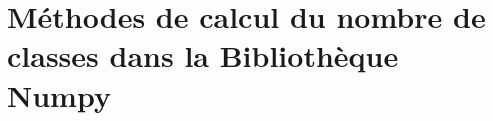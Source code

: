 \chapter{Méthodes de calcul du nombre de classes dans la Bibliothèque Numpy} \label{annexe:classes_méthodes}
